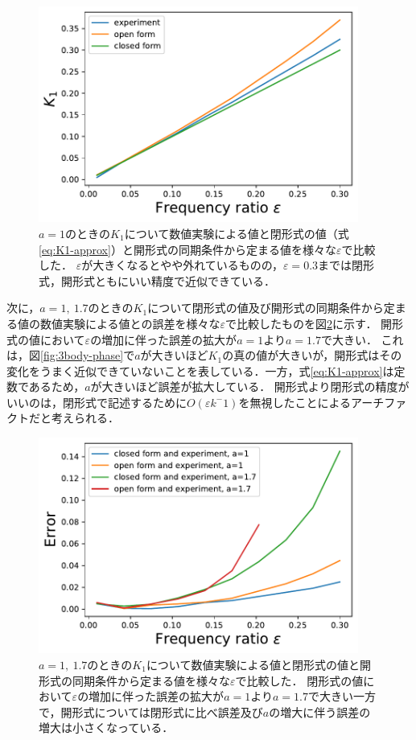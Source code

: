 \documentclass[../main]{subfiles}
\begin{document}
\begin{figure}[tbp]
\centering
\includegraphics[width=105mm]{./images/k1-compare.pdf}
\centering
\caption{$a=1$のときの$K_1$について数値実験による値と閉形式の値（式\eqref{eq:K1-approx}）と開形式の同期条件から定まる値を様々な$\varepsilon$で比較した．
$\varepsilon$が大きくなるとやや外れているものの，$\varepsilon=0.3$までは閉形式，開形式ともにいい精度で近似できている．}
\label{fig:k1-compare}
\end{figure}

次に，$a=1,\ 1.7$のときの$K_1$について閉形式の値及び開形式の同期条件から定まる値の数値実験による値との誤差を様々な$\varepsilon$で比較したものを図\ref{fig:k1-error}に示す．
開形式の値において$\varepsilon$の増加に伴った誤差の拡大が$a=1$より$a=1.7$で大きい．
これは，図\ref{fig:3body-phase}で$a$が大きいほど$K_1$の真の値が大きいが，開形式はその変化をうまく近似できていないことを表している．一方，式\eqref{eq:K1-approx}は定数であるため，$a$が大きいほど誤差が拡大している．
開形式より閉形式の精度がいいのは，閉形式で記述するために$O(\varepsilon k^-1)$を無視したことによるアーチファクトだと考えられる．

\begin{figure}[tbp]
\centering
\includegraphics[width=105mm]{./images/k1-error.pdf}
\centering
\caption{$a=1,\ 1.7$のときの$K_1$について数値実験による値と閉形式の値と開形式の同期条件から定まる値を様々な$\varepsilon$で比較した．
閉形式の値において$\varepsilon$の増加に伴った誤差の拡大が$a=1$より$a=1.7$で大きい一方で，開形式については閉形式に比べ誤差及び$a$の増大に伴う誤差の増大は小さくなっている．}
\label{fig:k1-error}
\end{figure}
\end{document}
